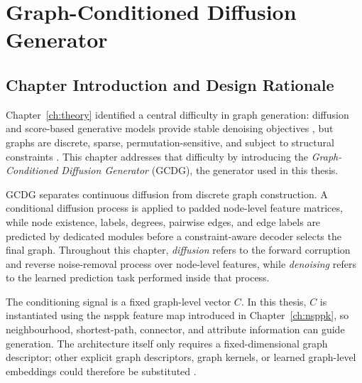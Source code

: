 \chapter{Graph-Conditioned Diffusion Generator}
\label{ch:generator}

\section{Chapter Introduction and Design Rationale}
\label{sec:generator:introduction}

Chapter~\ref{ch:theory} identified a central difficulty in graph generation:
diffusion and score-based generative models provide stable denoising objectives
\citep{ho2020ddpm,song2020score}, but graphs are discrete, sparse,
permutation-sensitive, and subject to structural constraints
\citep{you2018graphrnn,niu2020permutation,vignac2022digress}. This chapter
addresses that difficulty by introducing the
\emph{Graph-Conditioned Diffusion Generator} (GCDG), the generator used in this
thesis.

GCDG separates continuous diffusion from discrete graph construction. A
conditional diffusion process is applied to padded node-level feature matrices,
while node existence, labels, degrees, pairwise edges, and edge labels are
predicted by dedicated modules before a constraint-aware decoder selects the
final graph. Throughout this chapter,
\emph{diffusion} refers to the forward corruption and reverse noise-removal
process over node-level features, while \emph{denoising} refers to the learned
prediction task performed inside that process.

The conditioning signal is a fixed graph-level vector \(C\). In this thesis,
\(C\) is instantiated using the \gls{nsppk} feature map introduced in
Chapter~\ref{ch:nsppk}, so neighbourhood, shortest-path, connector, and
attribute information can guide generation. The architecture itself only
requires a fixed-dimensional graph descriptor; other explicit graph descriptors,
graph kernels, or learned graph-level embeddings could therefore be substituted
\citep{costa2010fast,neumann2016propagation,borgwardt2020graphkernels,
hamilton2017graphsage,zhang2018endtoend,dwivedi2021graph}.

